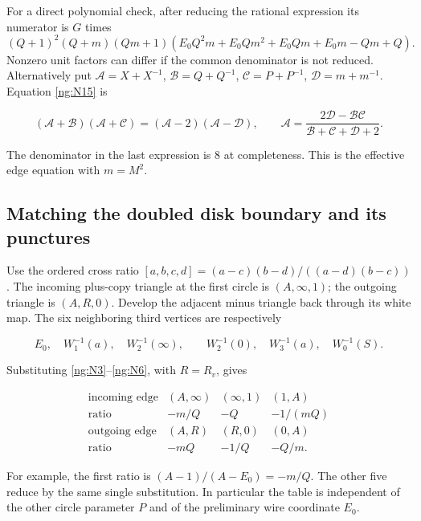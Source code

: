 For a direct polynomial check, after reducing the rational
expression its numerator is \(G\) times
\[
 (Q+1)^2(Q+m)(Qm+1)
       (E_0Q^2m+E_0Qm^2+E_0Qm+E_0m-Qm+Q).
\]
Nonzero unit factors can differ if the common denominator is not
reduced. Alternatively put
\(\mathcal A=X+X^{-1}\), \(\mathcal B=Q+Q^{-1}\),
\(\mathcal C=P+P^{-1}\), \(\mathcal D=m+m^{-1}\).
Equation \eqref{ng:N15} is

\begin{equation}\label{ng:N16}
(\mathcal A+\mathcal B)(\mathcal A+\mathcal C)
  =(\mathcal A-2)(\mathcal A-\mathcal D),\qquad
 \mathcal A=\frac{2\mathcal D-\mathcal B\mathcal C}
                  {\mathcal B+\mathcal C+\mathcal D+2}.
\end{equation}

The denominator in the last expression is \(8\) at completeness.
This is the effective edge equation with \(m=M^2\).

\subsection{Matching the doubled disk boundary and its punctures}\label{ng:the-full-disk-side-seam-including-its-main-punctures}

Use the ordered cross ratio
\([a,b,c,d]=(a-c)(b-d)/((a-d)(b-c))\).
The incoming plus-copy triangle at the first circle is
\((A,\infty,1)\); the outgoing triangle is \((A,R,0)\).
Develop the adjacent minus triangle back through its white
map. The six neighboring third vertices are respectively

\begin{equation}\label{ng:N17}
E_0,\quad W_1^{-1}(a),\quad W_2^{-1}(\infty),\qquad
 W_2^{-1}(0),\quad W_3^{-1}(a),\quad W_0^{-1}(S).
\end{equation}

Substituting \eqref{ng:N3}--\eqref{ng:N6}, with \(R=R_v\), gives

\begin{equation}\label{ng:N18}
\begin{array}{c|ccc}
 \text{incoming edge}&(A,\infty)&(\infty,1)&(1,A)\\ \hline
 \text{ratio}&-m/Q&-Q&-1/(mQ)\\
 \text{outgoing edge}&(A,R)&(R,0)&(0,A)\\ \hline
 \text{ratio}&-mQ&-1/Q&-Q/m .
\end{array}
\end{equation}

For example, the first ratio is \((A-1)/(A-E_0)=-m/Q\).
The other five reduce by the same single substitution. In particular
the table is independent of the other circle parameter \(P\) and
of the preliminary wire coordinate \(E_0\).

